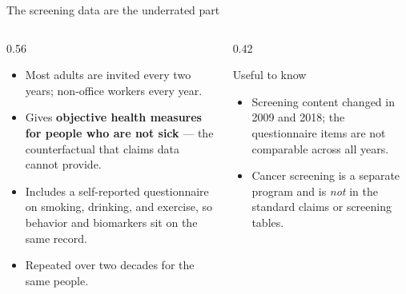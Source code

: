 \documentclass[aspectratio=169,11pt]{beamer}
\newcommand{\hl}[1]{\textbf{\color{kdgreen}#1}}
\begin{document}
\begin{frame}{The screening data are the underrated part}
  \begin{columns}[T]
    \begin{column}{0.56\textwidth}
      \begin{itemize}
        \setlength{\itemsep}{7pt}
        \item Most adults are invited every two years; non-office workers every year.
        \item Gives \hl{objective health measures for people who are not sick} ---
              the counterfactual that claims data cannot provide.
        \item Includes a self-reported questionnaire on smoking, drinking,
              and exercise, so behavior and biomarkers sit on the same record.
        \item Repeated over two decades for the same people.
      \end{itemize}
    \end{column}
    \begin{column}{0.42\textwidth}
      \begin{block}{Useful to know}
        \begin{itemize}\small
          \item Screening content changed in 2009 and 2018; the questionnaire items
                are not comparable across all years.
          \item Cancer screening is a separate program and is \emph{not} in the
                standard claims or screening tables.
        \end{itemize}
      \end{block}
    \end{column}
  \end{columns}
\end{frame}
\end{document}
